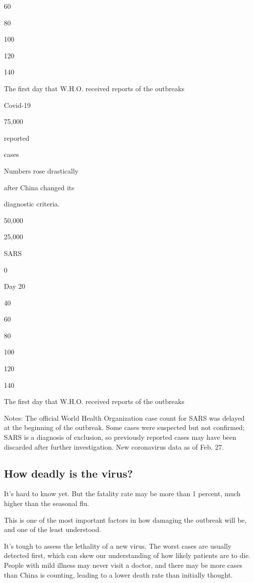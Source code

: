60

80

100

120

140

The first day that W.H.O. received reports of the outbreaks

Covid-19

75,000

reported

cases

Numbers rose drastically

after China changed its

diagnostic criteria.

50,000

25,000

SARS

0

Day 20

40

60

80

100

120

140

The first day that W.H.O. received reports of the outbreaks

Notes: The official World Health Organization case count for SARS was
delayed at the beginning of the outbreak. Some cases were suspected but
not confirmed; SARS is a diagnosis of exclusion, so previously reported
cases may have been discarded after further investigation. New
coronavirus data as of Feb. 27.

\hypertarget{how-deadly-is-the-virus}{%
\subsection{How deadly is the virus?}\label{how-deadly-is-the-virus}}

It's hard to know yet. But the fatality rate may be more than 1 percent,
much higher than the seasonal flu.

This is one of the most important factors in how damaging the outbreak
will be, and one of the least understood.

It's tough to assess the lethality of a new virus. The worst cases are
usually detected first, which can skew our understanding of how likely
patients are to die. People with mild illness may never visit a doctor,
and there may be more cases than China is counting, leading to a lower
death rate than initially thought.

